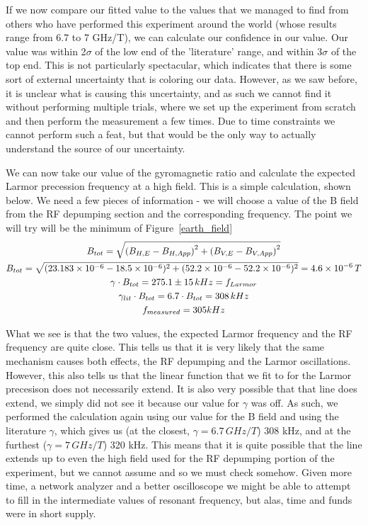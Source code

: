 \documentclass{article}
\DeclarePairedDelimiter{\parens}{\lparen}{\rparen}
\begin{document}
    \hspace{.25cm}

    If we now compare our fitted value to the values that we managed to find from others who have performed this experiment around the world (whose results range from 6.7 to 7 GHz/T), we can calculate our confidence in our value.  Our value was within 2$\sigma$ of the low end of the 'literature' range, and within 3$\sigma$ of the top end.  This is not particularly spectacular, which indicates that there is some sort of external uncertainty that is coloring our data.  However, as we saw before, it is unclear what is causing this uncertainty, and as such we cannot find it without performing multiple trials, where we set up the experiment from scratch and then perform the measurement a few times.  Due to time constraints we cannot perform such a feat, but that would be the only way to actually understand the source of our uncertainty.

    \hspace{.25cm}

    We can now take our value of the gyromagnetic ratio and calculate the expected Larmor precession frequency at a high field.  This is a simple calculation, shown below.  We need a few pieces of information - we will choose a value of the B field from the RF depumping section and the corresponding frequency.  The point we will try will be the minimum of Figure~\ref{earth_field}
    \begin{gather*}
      B_{tot} = \sqrt{\parens*{B_{H,E} - B_{H, App}}^2 + \parens*{B_{V, E} - B_{V, App}}^2} \\
      B_{tot} = \sqrt{(23.183\times10^{-6}-18.5\times{10^{-6}})^2+(52.2\times10^{-6}-52.2\times10^{-6})^2} = 4.6\times10^{-6} \, T \\
      \gamma \cdot B_{tot} = 275.1 \pm 15 \, kHz = f_{Larmor} \\
      \gamma_{lit} \cdot B_{tot} = 6.7 \cdot B_{tot} = 308 \, kHz \\
      f_{measured} = 305 kHz \\
    \end{gather*}

    What we see is that the two values, the expected Larmor frequency and the RF frequency are quite close.  This tells us that it is very likely that the same mechanism causes both effects, the RF depumping and the Larmor oscillations.  However, this also tells us that the linear function that we fit to for the Larmor precesison does not necessarily extend.  It is also very possible that that line does extend, we simply did not see it because our value for $\gamma$ was off.  As such, we performed the calculation again using our value for the B field and using the literature $\gamma$, which gives us (at the closest, $\gamma = 6.7 \, GHz/T$) 308 kHz, and at the furthest ($\gamma = 7 \, GHz/T$) 320 kHz.  This means that it is quite possible that the line extends up to even the high field used for the RF depumping portion of the experiment, but we cannot assume and so we must check somehow.  Given more time, a network analyzer and a better oscilloscope we might be able to attempt to fill in the intermediate values of resonant frequency, but alas, time and funds were in short supply.
\end{document}
